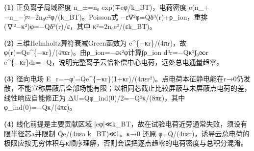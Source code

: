 \par\noindent\textbf{(1)} 正负离子局域密度 n\_±=n₀ exp(∓eφ/k\_BT)，电荷密度 e(n\_+−n\_−)≈−2n₀e²φ/(k\_BT)。Poisson式 −ε∇²φ=Qδ³(r)+ρ\_ion，重排 (∇²−κ²)φ=−Qδ³(r)/ε，其中 κ²=2n₀e²/(εk\_BT)。
\par\noindent\textbf{(2)} 三维Helmholtz算符衰减Green函数为 e\textasciicircum{}\{−κr\}/(4πr)，故 φ(r)=Qe\textasciicircum{}\{−κr\}/(4πεr)。由ρ\_ion=−εκ²φ计算∫ρ\_ion d³r=−Qκ²∫₀∞r e\textasciicircum{}\{−κr\}dr=−Q，说明完整离子云恰补偿中心电荷，远处总电通量趋零。
\par\noindent\textbf{(3)} 径向电场 E\_r=−φ'=Qe\textasciicircum{}\{−κr\}(1+κr)/(4πεr²)。点电荷本征静电能在r→0仍发散，不能宣称屏蔽后全部场能有限；以相同芯截止比较屏蔽与未屏蔽点电荷的差，线性响应自能修正为 ΔU=Qφ\_ind(0)/2=−Q²κ/(8πε)，其中 φ\_ind(0)=−Qκ/(4πε)。
\par\noindent\textbf{(4)} 线化前提是主要贡献区域 |eφ|≪k\_BT，故在试验电荷近旁通常失败，须设有限半径芯a并限制 Qe/(4πεa k\_BT)≪1。κ→0 还原 φ=Q/(4πεr)，诱导云总电荷的极限应按无穷体积与κ顺序理解，否则会误把逐点趋零的电荷密度与总积分混淆。
